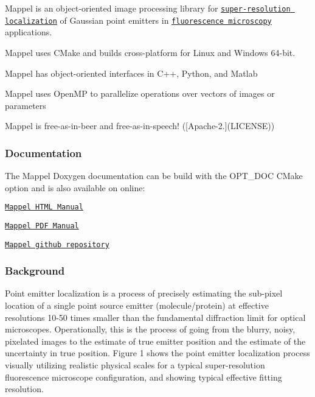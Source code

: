 Mappel is an object-\/oriented image processing library for \href{https://en.wikipedia.org/wiki/Super-resolution_microscopy#Localization_microscopy}{\tt super-\/resolution localization} of Gaussian point emitters in \href{https://en.wikipedia.org/wiki/Fluorescence_microscope#Sub-diffraction_techniques}{\tt fluorescence microscopy} applications.
\begin{DoxyItemize}
\item Mappel uses C\+Make and builds cross-\/platform for Linux and Windows 64-\/bit.
\item Mappel has object-\/oriented interfaces in C++, Python, and Matlab
\item Mappel uses Open\+MP to parallelize operations over vectors of images or parameters
\item Mappel is free-\/as-\/in-\/beer and free-\/as-\/in-\/speech! (\mbox{[}Apache-\/2.\mbox{]}(L\+I\+C\+E\+N\+SE))
\end{DoxyItemize}

\subsubsection*{Documentation}

The Mappel Doxygen documentation can be build with the {\ttfamily O\+P\+T\+\_\+\+D\+OC} C\+Make option and is also available on online\+:
\begin{DoxyItemize}
\item \href{https://markjolah.github.io/Mappel/index.html}{\tt Mappel H\+T\+ML Manual}
\item \href{https://markjolah.github.io/Mappel/pdf/Mappel-0.0.3-reference.pdf}{\tt Mappel P\+DF Manual}
\item \href{https://github.com/markjolah/Mappel}{\tt Mappel github repository}
\end{DoxyItemize}

\subsubsection*{Background}

Point emitter localization is a process of precisely estimating the sub-\/pixel location of a single point source emitter (molecule/protein) at effective resolutions 10-\/50 times smaller than the fundamental diffraction limit for optical microscopes. Operationally, this is the process of going from the blurry, noisy, pixelated images to the estimate of true emitter position and the estimate of the uncertainty in true position. Figure 1 shows the point emitter localization process visually utilizing realistic physical scales for a typical super-\/resolution fluorescence microscope configuration, and showing typical effective fitting resolution.



